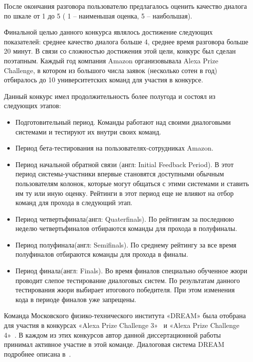 После окончания разговора пользователю предлагалось оценить качество диалога по шкале от 1 до 5 ( 1 -- наименьшая оценка, 5 -- наибольшая). 

Финальной целью данного конкурса являлось достижение следующих показателей: среднее качество диалога больше 4, среднее время разговора больше 20 минут. В связи со сложностью достижения этой цели, конкурс был сделан поэтапным. Каждый год компания Amazon организовывала Alexa Prize Challenge, в котором из большого числа заявок (несколько сотен в год) отбиралось до 10 университетских команд для участия в конкурсе. 

Данный конкурс имел продолжительность более полугода и состоял из следующих этапов:
\begin{itemize}
\item Подготовительный период. Команды работают над своими диалоговыми системами и тестируют их внутри своих команд.
\item Период бета-тестирования на пользователях-сотрудниках Amazon.
\item Период начальной обратной связи (англ: Initial Feedback Period). В этот период системы-участники впервые становятся доступными обычным пользователям колонок, которые могут общаться с этими системами и ставить им ту или иную оценку. Рейтинги в этот период еще не влияют на отбор команд для прохода в следующий этап.
\item Период четвертьфинала(англ: Quaterfinals). По рейтингам за последнюю неделю четвертьфиналов отбираются команды для прохода в полуфиналы.
\item Период полуфинала(англ: Semifinals). По среднему рейтингу за все время полуфиналов отбираются команды для прохода в финалы.
\item Период финала(англ: Finals). Во время финалов специально обученное жюри проводит слепое тестирование диалоговых систем. По результатам данного тестирования жюри выбирает итогового победителя. При этом изменения кода в периоде финалов уже запрещены.
\end{itemize}

Команда Московского физико-технического института «DREAM» была отобрана для участия в конкурсах «Alexa Prize Challenge 3»~\cite{na_website_ndh} и «Alexa Prize Challenge 4»~\cite{na_website_ndi}. В каждом из этих конкурсов автор данной диссертационной работы принимал активное участие в этой команде. Диалоговая система {DREAM} подробнее описана в~\cite{dream1, dream1_trudy, dream2}.

